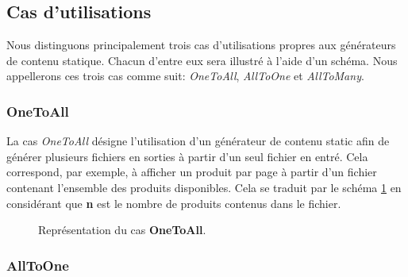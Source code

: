 	\subsection{Cas d'utilisations}
	
		Nous distinguons principalement trois cas d'utilisations propres aux générateurs de contenu statique. Chacun d'entre eux sera illustré à l'aide d'un schéma. Nous appellerons ces trois cas comme suit: \textit{OneToAll}, \textit{AllToOne} et \textit{AllToMany}.\\
		
		\subsubsection*{OneToAll}
		
			La cas \textit{OneToAll} désigne l'utilisation d'un générateur de contenu static afin de générer plusieurs fichiers en sorties à partir d'un seul fichier en entré. Cela correspond, par exemple, à afficher un produit par page à partir d'un fichier contenant l'ensemble des produits disponibles. Cela se traduit par le schéma \ref{fig:OneToAll} en considérant que \textbf{n} est le nombre de produits contenus dans le fichier.
			
			\begin{figure}
				\begin{center}
					\caption{Représentation du cas \textbf{OneToAll}.}
					\label{fig:OneToAll}
				\end{center}
			\end{figure}
		
		\subsubsection*{AllToOne}
		
